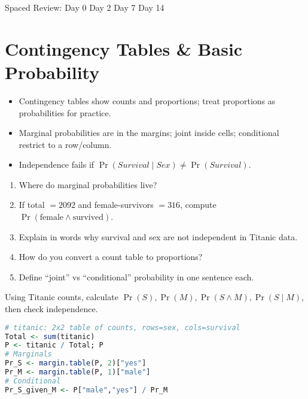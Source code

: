 \documentclass[11pt,a4paper]{article}
\def\textbf#1{#1}%
\newcommand{\reviewticks}{
  \vspace{0.4em}
  \noindent\scriptsize\textbf{Spaced Review:}
  \fbox{\phantom{D0}} Day 0\quad
  \fbox{\phantom{D2}} Day 2\quad
  \fbox{\phantom{D7}} Day 7\quad
  \fbox{\phantom{D14}} Day 14
}
\begin{document}
\reviewticks

\section{Contingency Tables \& Basic Probability}

\begin{corebox}
\begin{itemize}
  \item Contingency tables show \textbf{counts} and \textbf{proportions}; treat proportions as probabilities for practice.
  \item \textbf{Marginal} probabilities are in the margins; \textbf{joint} inside cells; \textbf{conditional} restrict to a row/column.
  \item Independence fails if \( \Pr(Survival \mid Sex) \ne \Pr(Survival) \).
\end{itemize}
\end{corebox}

\begin{recallbox}
\begin{enumerate}
  \item Where do marginal probabilities live?
  \item If total \(= 2092\) and female-survivors \(= 316\), compute \( \Pr(\text{female} \land \text{survived}) \).
  \item Explain in words why survival and sex are not independent in Titanic data.
  \item How do you convert a count table to proportions?
  \item Define ``joint'' vs ``conditional'' probability in one sentence each.
\end{enumerate}
\end{recallbox}

\begin{practicebox}
Using Titanic counts, calculate \( \Pr(S), \Pr(M), \Pr(S \land M), \Pr(S\mid M)\), then check independence.
\end{practicebox}

\begin{rbox}
\begin{lstlisting}[language=R]
# titanic: 2x2 table of counts, rows=sex, cols=survival
Total <- sum(titanic)
P <- titanic / Total; P
# Marginals
Pr_S <- margin.table(P, 2)["yes"]
Pr_M <- margin.table(P, 1)["male"]
# Conditional
Pr_S_given_M <- P["male","yes"] / Pr_M
\end{lstlisting}
\end{rbox}
\end{document}
